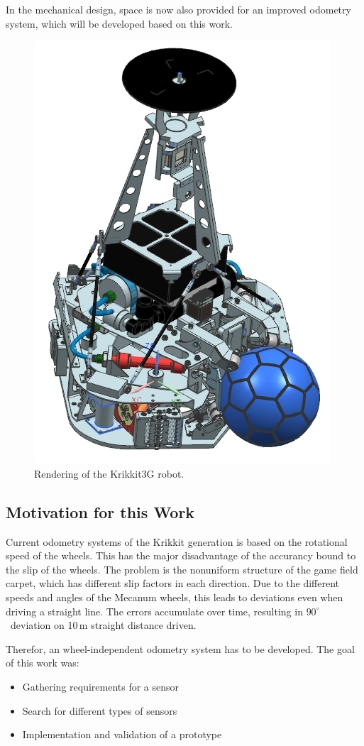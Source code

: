 \documentclass[12pt,a4paper]{article}
\begin{document}
In the mechanical design, space is now also provided for an improved odometry system, which will be developed based on this work.


\begin{figure}[b]
\begin{center}  
\includegraphics[width=0.5\columnwidth]{figures/Krikkit3G.jpg}
\caption{\label{fig:krikkit3g}
Rendering of the Krikkit3G robot.
}   
\end{center}
\end{figure}



\subsection{Motivation for this Work}
  
Current odometry systems of the Krikkit generation is based on the rotational speed of the wheels.
This has the major disadvantage of the accurancy bound to the slip of the wheels.
The problem is the nonuniform structure of the game field carpet, which has different slip factors in each direction.
Due to the different speeds and angles of the Mecanum wheels, this leads to deviations even when driving a straight line.
The errors accumulate over time, resulting in $90^\circ$~deviation on 10\,m straight distance driven.

Therefor, an wheel-independent odometry system has to be developed.
The goal of this work was:

\begin{itemize}
  \item Gathering requirements for a sensor
  \item Search for different types of sensors
  \item Implementation and validation of a prototype
\end{itemize}
\end{document}
